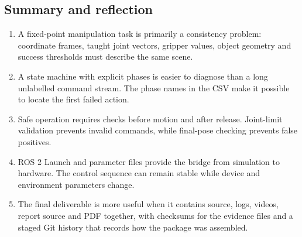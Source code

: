 \documentclass[11pt,a4paper]{article}
\begin{document}
\subsection{Summary and reflection}
\begin{enumerate}
\item A fixed-point manipulation task is primarily a consistency problem: coordinate frames, taught joint vectors, gripper values, object geometry and success thresholds must describe the same scene.
\item A state machine with explicit phases is easier to diagnose than a long unlabelled command stream. The phase names in the CSV make it possible to locate the first failed action.
\item Safe operation requires checks before motion and after release. Joint-limit validation prevents invalid commands, while final-pose checking prevents false positives.
\item ROS 2 Launch and parameter files provide the bridge from simulation to hardware. The control sequence can remain stable while device and environment parameters change.
\item The final deliverable is more useful when it contains source, logs, videos, report source and PDF together, with checksums for the evidence files and a staged Git history that records how the package was assembled.
\end{enumerate}
\end{document}
